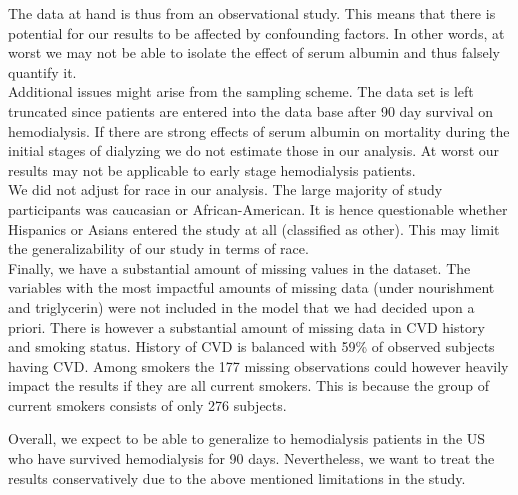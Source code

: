 \documentclass[paper=a4, fontsize=11pt]{scrartcl} %
\numberwithin{equation}{section} %
\numberwithin{figure}{section} %
\numberwithin{table}{section} %
\begin{document}
The data at hand is thus from an observational study. This means that there is potential for our results to be affected by confounding factors. In other words, at worst we may not be able to isolate the effect of serum albumin and thus falsely quantify it.\\

Additional issues might arise from the sampling scheme. The data set is left truncated since patients are entered into the data base after 90 day survival on hemodialysis. If there are strong effects of serum albumin on mortality during the initial stages of dialyzing we do not estimate those in our analysis. At worst our results may not be applicable to early stage hemodialysis patients.\\

We did not adjust for race in our analysis. The large majority of study participants was caucasian or African-American. It is hence questionable whether Hispanics or Asians entered the study at all (classified as other). This may limit the generalizability of our study in terms of race.\\

Finally, we have a substantial amount of missing values in the dataset. The variables with the most impactful amounts of missing data (under nourishment and triglycerin) were not included in the model that we had decided upon a priori. There is however a substantial amount of missing data in CVD history and smoking status. History of CVD is balanced with 59\% of observed subjects having CVD. Among smokers the 177 missing observations could however heavily impact the results if they are all current smokers. This is because the group of current smokers consists of only 276 subjects.


Overall, we expect to be able to generalize to hemodialysis patients in the US who have survived hemodialysis for 90 days. Nevertheless, we want to treat the results conservatively due to the above mentioned limitations in the study.
\end{document}

